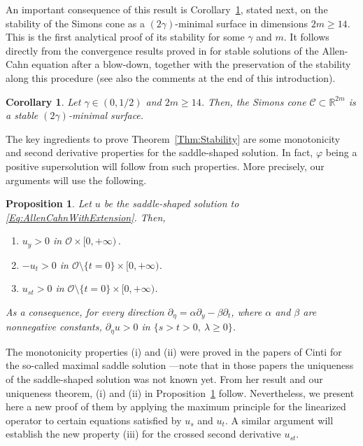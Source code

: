 \documentclass[12pt,reqno]{amsart}
\newtheorem{proposition}[theorem]{Proposition}
\newtheorem{corollary}[theorem]{Corollary}
\theoremstyle{definition}
\theoremstyle{remark}
\newcommand{\con}[1]{\mathbb{#1}}
\newcommand{\R}{\con{R}} %
\newcommand{\ccal}{\mathscr{C}}
\newcommand{\ocal}{\mathcal{O}}
\newcommand{\s}{\gamma}
\numberwithin{equation}{section}
\begin{document}
An important consequence of this result is Corollary~\ref{Cor:SimonsConeStableDim14}, stated next, on the stability of the Simons cone as a $(2\s)$-minimal surface in dimensions $2m\geq 14$. This is the first analytical proof of its stability for some $\s$ and $m$. It follows directly from the convergence results proved in \cite{CabreCintiSerra-Stable} for stable solutions of the Allen-Cahn equation after a blow-down, together with the preservation of the stability along this procedure (see also the comments at the end of this introduction).

\begin{corollary}
\label{Cor:SimonsConeStableDim14}
Let $\s \in (0,1/2)$ and $2m\geq 14$. Then, the Simons cone $\ccal \subset \R^{2m}$ is a stable $(2\s)$-minimal surface.
\end{corollary}


The key ingredients to prove Theorem~\ref{Thm:Stability} are some monotonicity and second derivative properties for the saddle-shaped solution. In fact, $\varphi$ being a positive supersolution will follow from such properties. More precisely, our arguments will use the following.

\begin{proposition}
\label{Prop:MonotonicityProperties}
Let $u$ be the saddle-shaped solution to \eqref{Eq:AllenCahnWithExtension}. Then,
\begin{enumerate}[label=(\roman{*})]
\item $u_y > 0$ in $\ocal \times [0, +\infty)$\,.
\item $-u_t > 0$ in $\ocal \setminus \{ t= 0\} \times [0,+\infty)$.
\item $u_{st} > 0$ in $\ocal\setminus \{ t = 0\} \times [0,+\infty)$.
\end{enumerate}
As a consequence, for every direction $\partial_\eta = \alpha \partial_y - \beta \partial_t$, where $\alpha$ and $\beta$ are nonnegative constants, $\partial_\eta u > 0$ in $ \{s > t > 0,\ \lambda \geq 0\}$.
\end{proposition}

The monotonicity properties (i) and (ii) were proved in the papers of Cinti \cite{Cinti-Saddle,Cinti-Saddle2} for the so-called maximal saddle solution ---note that in those papers the uniqueness of the saddle-shaped solution was not known yet. From her result and our uniqueness theorem, (i) and (ii) in Proposition~\ref{Prop:MonotonicityProperties} follow. Nevertheless, we present here a new proof of them by applying the maximum principle for the linearized operator to certain equations satisfied by $u_s$ and $u_t$. A similar argument will establish the new property (iii) for the crossed second derivative $u_{st}$. 
\end{document}
